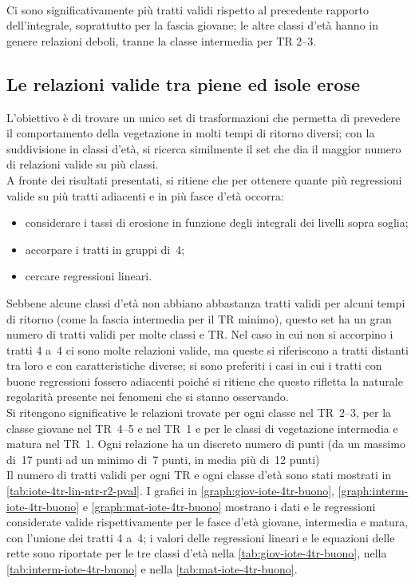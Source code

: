 %
\\
Ci sono significativamente più tratti validi rispetto al precedente rapporto dell'integrale, soprattutto per la fascia giovane; le altre classi d'età hanno in genere relazioni deboli, tranne la classe intermedia per TR \SIrange[range-phrase = {-}, range-units = single]{2}{3}{\mesi}.



\subsection{Le relazioni valide tra piene ed isole erose}
\label{sec:migliori-tratti-piene-erosione}
L'obiettivo è di trovare un unico set di trasformazioni che permetta di prevedere il comportamento della vegetazione in molti tempi di ritorno diversi; con la suddivisione in classi d'età, si ricerca similmente il set che dia il maggior numero di relazioni valide su più classi.
\\
A fronte dei risultati presentati, si ritiene che per ottenere quante più regressioni valide su più tratti adiacenti e in più fasce d'età occorra:
%
\begin{itemize}
	\item considerare i tassi di erosione in funzione degli integrali dei livelli sopra soglia;
	\item accorpare i tratti in gruppi di~4;
	\item cercare regressioni lineari.
\end{itemize}
%
Sebbene alcune classi d'età non abbiano abbastanza tratti validi per alcuni tempi di ritorno (come la fascia intermedia per il TR minimo), questo set ha un gran numero di tratti validi per molte classi e TR.
Nel caso in cui non si accorpino i tratti 4 a~4 ci sono molte relazioni valide, ma queste si riferiscono a tratti distanti tra loro e con caratteristiche diverse; si sono preferiti i casi in cui i tratti con buone regressioni fossero adiacenti poiché si ritiene che questo rifletta la naturale regolarità presente nei fenomeni che si stanno osservando.
\\
Si ritengono significative le relazioni trovate per ogni classe nel TR~\SIrange[range-phrase = {-}, range-units = single]{2}{3}{\mesi}, per la classe giovane nel TR~\SIrange[range-phrase = {-}, range-units = single]{4}{5}{\mesi} e nel TR~\SI{1}{\anno} e per le classi di vegetazione intermedia e matura nel TR~\SI{1}{\anno}.
Ogni relazione ha un discreto numero di punti (da un massimo di~17 punti ad un minimo di~7 punti, in media più di~12 punti)
\\
Il numero di tratti validi per ogni TR e ogni classe d'età sono stati mostrati in \cref{tab:iote-4tr-lin-ntr-r2-pval}.
I grafici in \cref{graph:giov-iote-4tr-buono}, \cref{graph:interm-iote-4tr-buono} e \cref{graph:mat-iote-4tr-buono} mostrano i dati e le regressioni considerate valide rispettivamente per le fasce d'età giovane, intermedia e matura, con l'unione dei tratti 4 a~4;
i valori delle regressioni lineari e le equazioni delle rette sono riportate per le tre classi d'età nella \cref{tab:giov-iote-4tr-buono}, nella \cref{tab:interm-iote-4tr-buono} e nella \cref{tab:mat-iote-4tr-buono}.

